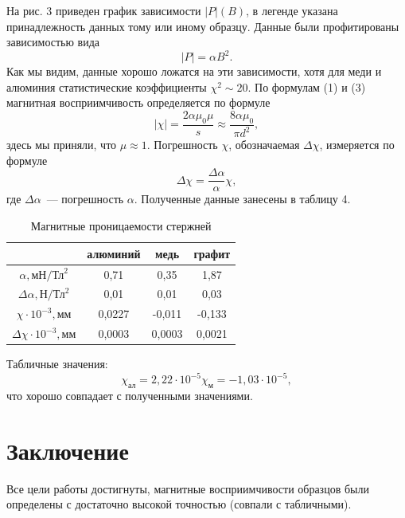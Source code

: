 \documentclass[12pt,a4paper]{article}
\begin{document}
На рис. 3 приведен график зависимости $|P|(B)$, в легенде указана принадлежность данных тому или иному образцу. Данные были профитированы зависимостью вида
\begin{equation}
|P| = \alpha B^2.
\end{equation}
Как мы видим, данные хорошо ложатся на эти зависимости, хотя для меди и алюминия статистические коэффициенты $\chi^2 \sim20$. По формулам (1) и (3) магнитная восприимчивость определяется по формуле
\begin{equation}
|\chi| = \frac{2\alpha\mu_0\mu}{s} \approx \frac{8\alpha\mu_0}{\pi d^2},
\end{equation}
здесь мы приняли, что $\mu \approx 1$. Погрешность $\chi$, обозначаемая $\Delta \chi$, измеряется по формуле
\begin{equation}
\Delta \chi = \frac{\Delta\alpha}{\alpha}\chi,
\end{equation}
где $\Delta\alpha$~--- погрешность $\alpha$. Полученные данные занесены в таблицу 4.
\begin{table}[ht]\centering
\begin{tabular}{|c|c|c|c|}
\hline
~&алюминий&медь&графит\\
\hline
$\alpha, \text{мН}/\text{Тл}^2$&0,71&0,35&1,87\\
\hline
$\Delta \alpha, \text{Н}/\text{Тл}^2$&0,01&0,01&0,03\\
\hline
$\chi\cdot 10^{-3}, \text{мм}$&0,0227&-0,011&-0,133\\
\hline
$\Delta\chi\cdot 10^{-3}, \text{мм}$&0,0003&0,0003&0,0021\\
\hline
\end{tabular}
\caption{Магнитные проницаемости стержней}
\end{table}

Табличные значения:
\begin{equation}
\chi_\text{ал} = 2,22 \cdot 10^{-5}
\chi_\text{м} = -1,03\cdot 10^{-5},
\end{equation}
что хорошо совпадает с полученными значениями.
\section{Заключение}
Все цели работы достигнуты, магнитные восприимчивости образцов были определены с достаточно высокой точностью (совпали с табличными).
\end{document}
